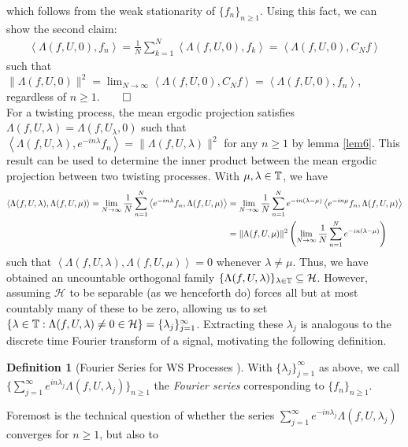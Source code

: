 \documentclass[11pt]{report}
\newcommand{\mc}[1]{\mathcal{#1}}
\newcommand{\ip}[2]{\left\langle#1,#2\right\rangle }
\theoremstyle{definition}
\newtheorem{definition}{Definition}
\begin{document}
    which follows from the weak stationarity of $\{f_n\}_{n\geq
    1}$. Using this fact, we can show the second claim:
    \begin{align*}
        \ip{\Lambda(f,U,0)}{f_n}=\frac{1}{N}\sum_{k=1}^N\ip{\Lambda(f,U,0)}{f_k}=\ip{\Lambda(f,U,0)}{C_Nf}
    \end{align*}
    such that
    $\|\Lambda(f,U,0)\|^2=\lim_{N\rightarrow\infty}\ip{\Lambda(f,U,0)}{C_Nf}=\ip{\Lambda(f,U,0)}{f_n}$,
    regardless of $n\geq 1$.\hfill{$\qed$}\\[5pt]
    \indent For a twisting process, the mean ergodic projection satisfies
    $\Lambda(f,U,\lambda)=\Lambda(f,U_\lambda,0)$ such that
    $\ip{\Lambda(f,U,\lambda)}{e^{-in\lambda}f_n}=\|\Lambda(f,U,\lambda)\|^2$
    for any $n\geq 1$ by lemma \ref{lem6}. This result can be used to determine
    the inner product between the mean ergodic projection between two twisting
    processes. With $\mu,\lambda\in\mathbb{T}$, we have
    \begin{align}
        \ip{\Lambda(f,U,\lambda)}{\Lambda(f,U,\mu)}=\lim_{N\rightarrow\infty}\frac{1}{N}\sum_{n=1}^N\ip{e^{-in\lambda}f_n}{\Lambda(f,U,\mu)}&=\lim_{N\rightarrow\infty}\frac{1}{N}\sum_{n=1}^Ne^{-in(\lambda-\mu)}\ip{e^{-in\mu}f_n}{\Lambda(f,U,\mu)}\notag\\
        &=\|\Lambda(f,U,\mu)\|^2\left(\lim_{N\rightarrow\infty}\frac{1}{N}\sum_{n=1}^Ne^{-in(\lambda-\mu)}\right)\label{eq4}
    \end{align}
    such that $\ip{\Lambda(f,U,\lambda)}{\Lambda(f,U,\mu)}=0$ whenever
    $\lambda\neq\mu$. Thus, we have obtained an uncountable orthogonal family
    $\{\Lambda(f,U,\lambda)\}_{\lambda\in\mbb{T}}\subseteq\mc{H}$. However,
    assuming $\mc{H}$ to be separable (as we henceforth do) forces all but at
    most countably many of these to be zero, allowing us to set
    $\{\lambda\in\mbb{T}:\Lambda(f,U,\lambda)\neq
    0\in\mc{H}\}=\{\lambda_j\}_{j=1}^\infty$. Extracting these $\lambda_j$ is analogous
    to the discrete time Fourier transform of a signal, motivating the following definition.
    \begin{definition}[Fourier Series for WS Processes {\cite[\S6]{Fan_1946}}]\label{def4}
        With $\{\lambda_j\}_{j=1}^\infty$ as above, we call $\{\sum_{j=1}^\infty e^{in\lambda_j}\Lambda(f,U,\lambda_j)\}_{n\geq 1}$
        the \textit{Fourier series} corresponding to $\{f_n\}_{n\geq 1}$.
    \end{definition}
    Foremost is the technical question of whether the series $\sum_{j=1}^\infty
    e^{-in\lambda_j}\Lambda(f,U,\lambda_j)$ converges for $n\geq 1$, but also to
\end{document}
